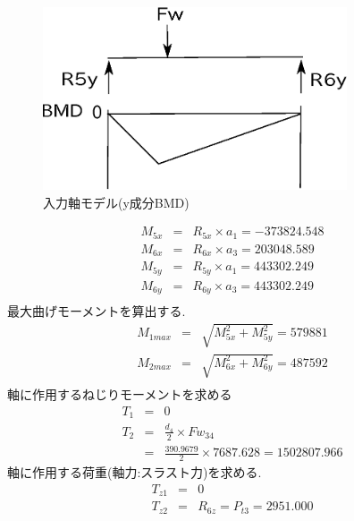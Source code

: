 \begin{figure}[htbp]
\begin{center}
\includegraphics[width=9cm]{../picture/jiku332.eps}
\end{center}
\caption{入力軸モデル(y成分BMD)}
\end{figure}
\begin{eqnarray}
M_{5x} &=& R_{5x} \times a_1       =-373824.548\\
M_{6x} &=& R_{6x} \times a_3       =203048.589\\
M_{5y} &=& R_{5y} \times a_1       =443302.249 \\
M_{6y} &=& R_{6y} \times a_3       =443302.249 \\
\end{eqnarray}
最大曲げモーメントを算出する.
\begin{eqnarray}
M_{1max} &=& \sqrt {M_{5x}^2+M_{5y}^2} = 579881\\
M_{2max} &=& \sqrt {M_{6x}^2+M_{6y}^2} = 487592\\
\end{eqnarray}
軸に作用するねじりモーメントを求める
\begin{eqnarray}
T_{1} &=& 0\\
T_{2} &=& \frac{d_4}{2} \times Fw_{34}\\
      &=& \frac{390.9679}{2} \times 7687.628 = 1502807.966
\end{eqnarray}
軸に作用する荷重(軸力:スラスト力)を求める.
\begin{eqnarray}
T_{z1} &=& 0\\
T_{z2} &=& R_{6z} = P_{t3} = 2951.000
\end{eqnarray}






